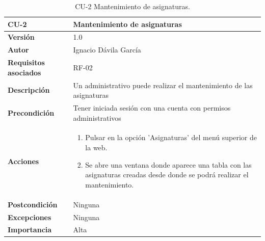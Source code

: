 \begin{table}[p]
	\centering
	\begin{tabularx}{\linewidth}{ p{} p{} }
		\toprule
		\textbf{CU-2}    & \textbf{Mantenimiento de asignaturas}\\
		\toprule
		\textbf{Versión}              & 1.0    \\
		\textbf{Autor}                & Ignacio Dávila García \\
		\textbf{Requisitos asociados} & RF-02 \\
		\textbf{Descripción}          & Un administrativo puede realizar el mantenimiento de las asignaturas \\
		\textbf{Precondición}         & Tener iniciada sesión con una cuenta con permisos administrativos \\
		\textbf{Acciones}             &
		\begin{enumerate}
			\def\labelenumi{\arabic{enumi}.}
			\tightlist
			\item Pulsar en la opción 'Asignaturas' del menú superior de la web.
			\item Se abre una ventana donde aparece una tabla con las asignaturas creadas desde donde se podrá realizar el mantenimiento.
		\end{enumerate}\\
		\textbf{Postcondición}        & Ninguna \\
		\textbf{Excepciones}          & Ninguna \\
		\textbf{Importancia}          & Alta \\
		\bottomrule
	\end{tabularx}
	\caption{CU-2 Mantenimiento de asignaturas.}
\end{table}

